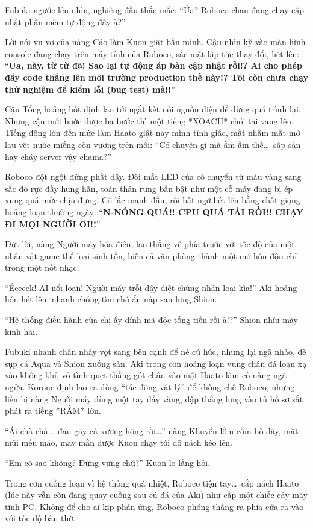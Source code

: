 \documentclass[../main.tex]{subfiles}
\begin{document}
Fubuki ngước lên nhìn, nghiêng đầu thắc mắc: ``Ủa? Roboco-chan đang chạy cập nhật phần mềm tự động đấy à?''

Lời nói vu vơ của nàng Cáo làm Kuon giật bắn mình. Cậu nhìn kỹ vào màn hình console đang chạy trên máy tính của Roboco, sắc mặt lập tức thay đổi, hét lên: ``\textbf{Ủa, này, từ từ đã! Sao lại tự động áp bản cập nhật rồi!? Ai cho phép đẩy code thẳng lên môi trường production thế này!? Tôi còn chưa chạy thử nghiệm để kiểm lỗi (bug test) mà!!}''

Cậu Tổng hoảng hốt định lao tới ngắt kết nối nguồn điện để dừng quá trình lại. Nhưng cậu mới bước được ba bước thì một tiếng *XOẠCH* chói tai vang lên. Tiếng động lớn đến mức làm Haato giật nảy mình tỉnh giấc, mắt nhắm mắt mở lau vệt nước miếng còn vương trên môi: ``Có chuyện gì mà ầm ầm thế\dots\ sập sàn hay cháy server vậy-chama?''

Roboco đột ngột đứng phắt dậy. Đôi mắt LED của cô chuyển từ màu vàng sang sắc đỏ rực đầy hung hãn, toàn thân rung bần bật như một cỗ máy đang bị ép xung quá mức chịu đựng. Cô lắc mạnh đầu, rồi bất ngờ hét lên bằng chất giọng hoảng loạn thường ngày: ``\textbf{N-NÓNG QUÁ!! CPU QUÁ TẢI RỒI!! CHẠY ĐI MỌI NGƯỜI ƠI!!}''

Dứt lời, nàng Người máy hóa điên, lao thẳng về phía trước với tốc độ của một nhân vật game thể loại sinh tồn, biến cả văn phòng thành một mớ hỗn độn chỉ trong một nốt nhạc.

``Éeeeek! AI nổi loạn! Người máy trỗi dậy diệt chủng nhân loại kìa!'' Aki hoảng hồn hét lên, nhanh chóng tìm chỗ ẩn nấp sau lưng Shion.

``Hệ thống điều hành của chị ấy dính mã độc tống tiền rồi à!?'' Shion nhíu mày kinh hãi.

Fubuki nhanh chân nhảy vọt sang bên cạnh để né cú húc, nhưng lại ngã nhào, đè sụp cả Aqua và Shion xuống sàn. Aki trong cơn hoảng loạn vung chân đá loạn xạ vào không khí, vô tình quẹt thẳng gót chân vào mặt Haato làm cô nàng ngã ngửa. Korone định lao ra dùng ``tác động vật lý'' để khống chế Roboco, nhưng liền bị nàng Người máy dùng một tay đẩy văng, đập thẳng lưng vào tủ hồ sơ sắt phát ra tiếng *RẦM* lớn.

``Ái chà chà\dots\ đau gãy cả xương hông rồi\dots'' nàng Khuyển lồm cồm bò dậy, mặt mũi mếu máo, may mắn được Kuon chạy tới đỡ nách kéo lên.

``Em có sao không? Đứng vững chứ?'' Kuon lo lắng hỏi.

Trong cơn cuồng loạn vì hệ thống quá nhiệt, Roboco tiện tay\dots\ cắp nách Haato (lúc này vẫn còn đang quay cuồng sau cú đá của Aki) như cắp một chiếc cây máy tính PC. Không để cho ai kịp phản ứng, Roboco phóng thẳng ra phía cửa ra vào với tốc độ bàn thờ.
\end{document}
